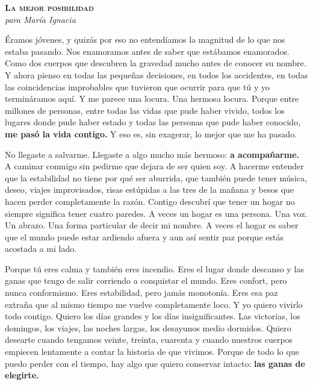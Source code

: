 \documentclass[10pt,twocolumn]{article}
\begin{document}
\newcommand{\poemaseccion}[1]{\par\vspace{8pt}{\centering\small\scshape\color{madera}#1\par}\vspace{3pt}}
\begin{center}
{\Large\bfseries\scshape La mejor posibilidad}\\[2pt]
{\small\itshape para María Ignacia}
\end{center}
\vspace{6pt}
\begingroup
\setlength{\parskip}{7pt}\setlength{\parindent}{0pt}
\begin{list}{}{\setlength{\leftmargin}{2.4cm}\setlength{\rightmargin}{2.4cm}\setlength{\topsep}{0pt}\setlength{\partopsep}{0pt}}\item[]
\fontsize{10.5}{15.5}\selectfont
Éramos jóvenes, y quizás por eso no entendíamos la magnitud de lo que nos estaba pasando. Nos enamoramos antes de saber que estábamos enamorados. Como dos cuerpos que descubren la gravedad mucho antes de conocer su nombre. Y ahora pienso en todas las pequeñas decisiones, en todos los accidentes, en todas las coincidencias improbables que tuvieron que ocurrir para que tú y yo termináramos aquí. Y me parece una locura. Una hermosa locura. Porque entre millones de personas, entre todas las vidas que pude haber vivido, todos los lugares donde pude haber estado y todas las personas que pude haber conocido, \textbf{me pasó la vida contigo.} Y eso es, sin exagerar, lo mejor que me ha pasado.

No llegaste a salvarme. Llegaste a algo mucho más hermoso: \textbf{a acompañarme.} A caminar conmigo sin pedirme que dejara de ser quien soy. A hacerme entender que la estabilidad no tiene por qué ser aburrida, que también puede tener música, deseo, viajes improvisados, risas estúpidas a las tres de la mañana y besos que hacen perder completamente la razón. Contigo descubrí que tener un hogar no siempre significa tener cuatro paredes. A veces un hogar es una persona. Una voz. Un abrazo. Una forma particular de decir mi nombre. A veces el hogar es saber que el mundo puede estar ardiendo afuera y aun así sentir paz porque estás acostada a mi lado.

\poemaseccion{Coro}

Porque tú eres calma y también eres incendio. Eres el lugar donde descanso y las ganas que tengo de salir corriendo a conquistar el mundo. Eres confort, pero nunca conformismo. Eres estabilidad, pero jamás monotonía. Eres esa paz extraña que al mismo tiempo me vuelve completamente loco. Y yo quiero vivirlo todo contigo. Quiero los días grandes y los días insignificantes. Las victorias, los domingos, los viajes, las noches largas, los desayunos medio dormidos. Quiero desearte cuando tengamos veinte, treinta, cuarenta y cuando nuestros cuerpos empiecen lentamente a contar la historia de que vivimos. Porque de todo lo que puedo perder con el tiempo, hay algo que quiero conservar intacto: \textbf{las ganas de elegirte.}


\end{list}
\end{document}
